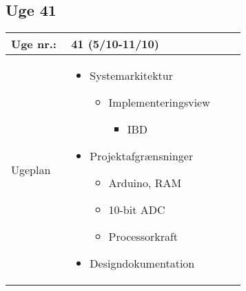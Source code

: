 	\subsection{Uge 41}
	\begin{longtable}{|p{0.24\linewidth}|p{0.7\linewidth}|}
		\hline
		Uge nr.: & 41 (5/10-11/10)\\ \hline
		Ugeplan & 
		\begin{itemize}
			\item Systemarkitektur
			\begin{itemize} 
				\item Implementeringsview
				\begin{itemize}
					\item IBD 
				\end{itemize}
			\end{itemize}
			\item Projektafgrænsninger
			\begin{itemize}
				\item Arduino, RAM
				\item 10-bit ADC 
				\item Processorkraft 
			\end{itemize}
			\item Designdokumentation
		\end{itemize}
		

\end{longtable}
